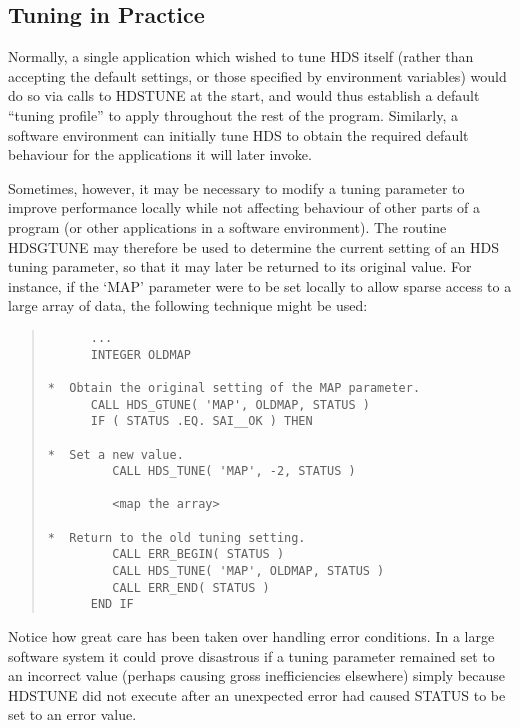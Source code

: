 \documentclass[twoside,11pt]{article}
\newcommand{\htmlref}[2]{#1}
\newcommand{\xlabel}[1]{}
\renewcommand{\_}{\texttt{\symbol{95}}}
\newcommand{\qt}[1]{``#1''}
\newcommand{\qt}[1]{{\tt{"}}#1{\tt{"}}}
\begin{document}
\subsection{\xlabel{tuning_in_practice}\label{sect:gtune}Tuning in Practice}

Normally, a single application which wished to tune HDS itself (rather
than accepting the default settings, or those specified by environment
variables) would do so via calls to \htmlref{HDS\_TUNE}{HDS_TUNE} at
the start, and would thus establish a default \qt{tuning profile} to
apply throughout the rest of the program.  Similarly, a software
environment can initially tune HDS to obtain the required default
behaviour for the applications it will later invoke.

Sometimes, however, it may be necessary to modify a tuning parameter
to improve performance locally while not affecting behaviour of other
parts of a program (or other applications in a software
environment). The routine \htmlref{HDS\_GTUNE}{HDS_GTUNE} may
therefore be used to determine the current setting of an HDS tuning
parameter, so that it may later be returned to its original value. For
instance, if the `MAP' parameter were to be set locally to allow
sparse access to a large array of data, the following technique might
be used:

\small
\begin{quote}
\begin{verbatim}
      ...
      INTEGER OLDMAP

*  Obtain the original setting of the MAP parameter.
      CALL HDS_GTUNE( 'MAP', OLDMAP, STATUS )
      IF ( STATUS .EQ. SAI__OK ) THEN

*  Set a new value.
         CALL HDS_TUNE( 'MAP', -2, STATUS )

         <map the array>

*  Return to the old tuning setting.
         CALL ERR_BEGIN( STATUS )
         CALL HDS_TUNE( 'MAP', OLDMAP, STATUS )
         CALL ERR_END( STATUS )
      END IF
\end{verbatim}
\end{quote}
\normalsize

Notice how great care has been taken over handling error
conditions. In a large software system it could prove disastrous if a
tuning parameter remained set to an incorrect value (perhaps causing
gross inefficiencies elsewhere) simply because HDS\_TUNE did not
execute after an unexpected error had caused STATUS to be set to an
error value.
\end{document}
